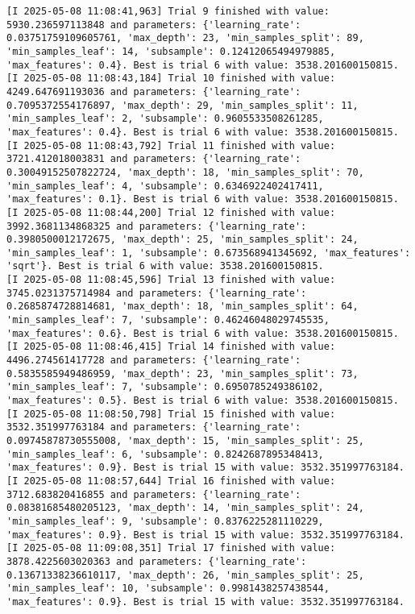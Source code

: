 \documentclass[
  letterpaper,
  DIV=11,
  numbers=noendperiod]{scrreprt}
\begin{document}
\begin{verbatim}
[I 2025-05-08 11:08:41,963] Trial 9 finished with value: 5930.236597113848 and parameters: {'learning_rate': 0.03751759109605761, 'max_depth': 23, 'min_samples_split': 89, 'min_samples_leaf': 14, 'subsample': 0.12412065494979885, 'max_features': 0.4}. Best is trial 6 with value: 3538.201600150815.
[I 2025-05-08 11:08:43,184] Trial 10 finished with value: 4249.647691193036 and parameters: {'learning_rate': 0.7095372554176897, 'max_depth': 29, 'min_samples_split': 11, 'min_samples_leaf': 2, 'subsample': 0.9605533508261285, 'max_features': 0.4}. Best is trial 6 with value: 3538.201600150815.
[I 2025-05-08 11:08:43,792] Trial 11 finished with value: 3721.412018003831 and parameters: {'learning_rate': 0.30049152507822724, 'max_depth': 18, 'min_samples_split': 70, 'min_samples_leaf': 4, 'subsample': 0.6346922402417411, 'max_features': 0.1}. Best is trial 6 with value: 3538.201600150815.
[I 2025-05-08 11:08:44,200] Trial 12 finished with value: 3992.3681134868325 and parameters: {'learning_rate': 0.3980500012172675, 'max_depth': 25, 'min_samples_split': 24, 'min_samples_leaf': 1, 'subsample': 0.673568941345692, 'max_features': 'sqrt'}. Best is trial 6 with value: 3538.201600150815.
[I 2025-05-08 11:08:45,596] Trial 13 finished with value: 3745.0231375714984 and parameters: {'learning_rate': 0.2685874728814681, 'max_depth': 18, 'min_samples_split': 64, 'min_samples_leaf': 7, 'subsample': 0.46246048029745535, 'max_features': 0.6}. Best is trial 6 with value: 3538.201600150815.
[I 2025-05-08 11:08:46,415] Trial 14 finished with value: 4496.274561417728 and parameters: {'learning_rate': 0.5835585949486959, 'max_depth': 23, 'min_samples_split': 73, 'min_samples_leaf': 7, 'subsample': 0.6950785249386102, 'max_features': 0.5}. Best is trial 6 with value: 3538.201600150815.
[I 2025-05-08 11:08:50,798] Trial 15 finished with value: 3532.351997763184 and parameters: {'learning_rate': 0.09745878730555008, 'max_depth': 15, 'min_samples_split': 25, 'min_samples_leaf': 6, 'subsample': 0.8242687895348413, 'max_features': 0.9}. Best is trial 15 with value: 3532.351997763184.
[I 2025-05-08 11:08:57,644] Trial 16 finished with value: 3712.683820416855 and parameters: {'learning_rate': 0.08381685480205123, 'max_depth': 14, 'min_samples_split': 24, 'min_samples_leaf': 9, 'subsample': 0.8376225281110229, 'max_features': 0.9}. Best is trial 15 with value: 3532.351997763184.
[I 2025-05-08 11:09:08,351] Trial 17 finished with value: 3878.4225603020363 and parameters: {'learning_rate': 0.13671338236610117, 'max_depth': 26, 'min_samples_split': 25, 'min_samples_leaf': 10, 'subsample': 0.9981438257438544, 'max_features': 0.9}. Best is trial 15 with value: 3532.351997763184.

\end{verbatim}
\end{document}
